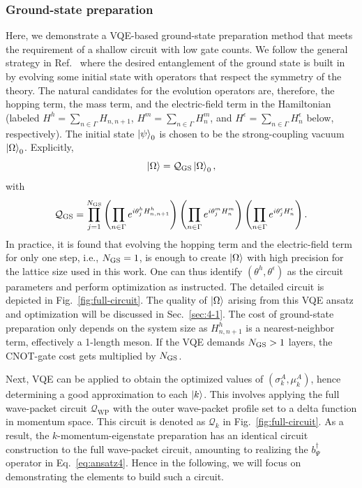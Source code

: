 \documentclass[a4paper,onecolumn,11pt,accepted=2024-10-11]{quantumarticle}
\begin{document}
\subsubsection{Ground-state preparation}
\label{sec:3-1-1}
Here, we demonstrate a VQE-based ground-state preparation method that meets the requirement of a shallow circuit with low gate counts. We follow the general strategy in Ref.~\cite{Lumia:2021tpu} where the desired entanglement of the ground state is built in by evolving some initial state with operators that respect the symmetry of the theory. The natural candidates for the evolution operators are, therefore, the hopping term, the mass term, and the electric-field term in the Hamiltonian (labeled $H^h = \sum_{n \in \Gamma} H_{n,n+1}$, $H^m=\sum_{n \in \Gamma}H^m_n$, and $H^\epsilon=\sum_{n \in \Gamma} H^\epsilon_n$ below, respectively). The initial state $\ket{\psi}_0$ is chosen to be the strong-coupling vacuum $\ket{\Omega}_{0}$. Explicitly,
%
\begin{equation}
\ket{\Omega} = \mathcal{Q}_{\text{GS}} \ket{\Omega}_{0},
\label{eq:algo_gs_I}
\end{equation}
%
with 
%
\begin{equation}
\mathcal{Q}_{\text{GS}} = \prod_{j=1}^{N_{\rm GS}} \left(\prod_{n \in \Gamma}{e^{i \theta_j^{h} H_{n,n+1}^{h} }}\right) \left(\prod_{n \in \Gamma}e^{i \theta_j^{m} H^{m}_n }\right) \left(\prod_{n \in \Gamma }e^{i \theta_j^{\epsilon} H^{\epsilon}_n }\right).
\label{eq:algo_gs_II}
\end{equation}
%
In practice, it is found that evolving the hopping term and the electric-field term for only one step, i.e., $N_{\rm GS}=1$, is enough to create $\ket{\Omega}$ with high precision for the lattice size used in this work. One can thus identify $\left(\theta^{h},\theta^{\epsilon} \right)$ as the circuit parameters and perform optimization as instructed. The detailed circuit 
is depicted in Fig.~\ref{fig:full-circuit}. The quality of $\ket{\Omega}$ 
arising from this VQE ansatz and optimization will be discussed in Sec.~\ref{sec:4-1}. The cost of ground-state preparation only depends on the system size as $H_{n,n+1}^{h}$ is a nearest-neighbor term, effectively a 1-length meson. 
If the VQE demands $N_{\rm GS}>1$ layers, the CNOT-gate cost gets multiplied by $N_{\rm GS}$.

Next, VQE can be applied to obtain the optimized values of $(\sigma_k^A, \mu_k^A)$, hence determining a good approximation to each $\ket{k}$. This involves applying the full wave-packet circuit $\mathcal{Q}_{\text{WP}}$ with the outer wave-packet profile set to a delta function in momentum space. This circuit is denoted as $\mathcal{Q}_k$ in Fig.~\ref{fig:full-circuit}. As a result, the $k$-momentum-eigenstate preparation has an identical circuit construction to the full wave-packet circuit, amounting to realizing the $b_\Psi^\dagger$ operator in Eq.~\eqref{eq:ansatz4}. Hence in the following, we will focus on demonstrating the elements to build such a circuit.
\end{document}
